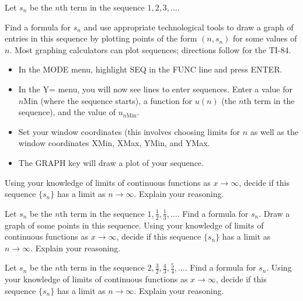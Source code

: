 \begin{activity} \label{8.1.Act1}
\ba
\item Let $s_n$ be the $n$th term in the sequence $1, 2, 3, \ldots$. 

Find a formula for $s_n$ and use appropriate technological tools to draw a graph of entries in this sequence by plotting points of the form $(n,s_n)$ for some values of $n$. Most graphing calculators can plot sequences; directions follow for the TI-84.
\begin{itemize}
\item In the MODE menu, highlight SEQ in the FUNC line and press ENTER.
\item In the Y= menu, you will now see lines to enter sequences. Enter a value for $n$Min (where the sequence starts), a function for $u(n)$ (the $n$th term in the sequence), and the value of $u_{n\text{Min}}$.
\item Set your window coordinates (this involves choosing limits for $n$ as well as the window coordinates XMin, XMax, YMin, and YMax.
\item The GRAPH key will draw a plot of your  sequence.
\end{itemize}
Using your knowledge of limits of continuous functions as $x \to \infty$, decide if this sequence $\{s_n\}$ has a limit as $n \to \infty$. Explain your reasoning.

\item Let $s_n$ be the $n$th term in the sequence $1, \frac{1}{2}, \frac{1}{3}, \ldots$. Find a formula for $s_n$. Draw a graph of some points in this sequence. Using your knowledge of limits of continuous functions as $x \to \infty$, decide if this sequence $\{s_n\}$ has a limit as $n \to \infty$. Explain your reasoning.

\item Let $s_n$ be the $n$th term in the sequence $2, \frac{3}{2}, \frac{4}{3}, \frac{5}{4}, \ldots$. Find a formula for $s_n$. Using your knowledge of limits of continuous functions as $x \to \infty$, decide if this sequence $\{s_n\}$ has a limit as $n \to \infty$. Explain your reasoning.

\ea
\end{activity}

